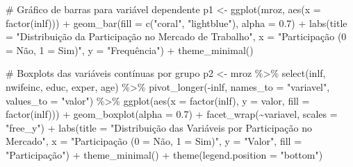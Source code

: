 \documentclass[
  letterpaper,
  DIV=11,
  numbers=noendperiod]{scrartcl}
\newenvironment{Shaded}{\begin{snugshade}}{\end{snugshade}}
\newcommand{\AttributeTok}[1]{\textcolor[rgb]{0.40,0.45,0.13}{#1}}
\newcommand{\CommentTok}[1]{\textcolor[rgb]{0.37,0.37,0.37}{#1}}
\newcommand{\FloatTok}[1]{\textcolor[rgb]{0.68,0.00,0.00}{#1}}
\newcommand{\FunctionTok}[1]{\textcolor[rgb]{0.28,0.35,0.67}{#1}}
\newcommand{\NormalTok}[1]{\textcolor[rgb]{0.00,0.23,0.31}{#1}}
\newcommand{\OtherTok}[1]{\textcolor[rgb]{0.00,0.23,0.31}{#1}}
\newcommand{\SpecialCharTok}[1]{\textcolor[rgb]{0.37,0.37,0.37}{#1}}
\newcommand{\StringTok}[1]{\textcolor[rgb]{0.13,0.47,0.30}{#1}}
\begin{document}
\begin{Shaded}
\begin{Highlighting}[]
\CommentTok{\# Gráfico de barras para variável dependente}
\NormalTok{p1 }\OtherTok{\textless{}{-}} \FunctionTok{ggplot}\NormalTok{(mroz, }\FunctionTok{aes}\NormalTok{(}\AttributeTok{x =} \FunctionTok{factor}\NormalTok{(inlf))) }\SpecialCharTok{+}
  \FunctionTok{geom\_bar}\NormalTok{(}\AttributeTok{fill =} \FunctionTok{c}\NormalTok{(}\StringTok{"coral"}\NormalTok{, }\StringTok{"lightblue"}\NormalTok{), }\AttributeTok{alpha =} \FloatTok{0.7}\NormalTok{) }\SpecialCharTok{+}
  \FunctionTok{labs}\NormalTok{(}\AttributeTok{title =} \StringTok{"Distribuição da Participação no Mercado de Trabalho"}\NormalTok{,}
       \AttributeTok{x =} \StringTok{"Participação (0 = Não, 1 = Sim)"}\NormalTok{,}
       \AttributeTok{y =} \StringTok{"Frequência"}\NormalTok{) }\SpecialCharTok{+}
  \FunctionTok{theme\_minimal}\NormalTok{()}

\CommentTok{\# Boxplots das variáveis contínuas por grupo}
\NormalTok{p2 }\OtherTok{\textless{}{-}}\NormalTok{ mroz }\SpecialCharTok{\%\textgreater{}\%}
  \FunctionTok{select}\NormalTok{(inlf, nwifeinc, educ, exper, age) }\SpecialCharTok{\%\textgreater{}\%}
  \FunctionTok{pivot\_longer}\NormalTok{(}\SpecialCharTok{{-}}\NormalTok{inlf, }\AttributeTok{names\_to =} \StringTok{"variavel"}\NormalTok{, }\AttributeTok{values\_to =} \StringTok{"valor"}\NormalTok{) }\SpecialCharTok{\%\textgreater{}\%}
  \FunctionTok{ggplot}\NormalTok{(}\FunctionTok{aes}\NormalTok{(}\AttributeTok{x =} \FunctionTok{factor}\NormalTok{(inlf), }\AttributeTok{y =}\NormalTok{ valor, }\AttributeTok{fill =} \FunctionTok{factor}\NormalTok{(inlf))) }\SpecialCharTok{+}
  \FunctionTok{geom\_boxplot}\NormalTok{(}\AttributeTok{alpha =} \FloatTok{0.7}\NormalTok{) }\SpecialCharTok{+}
  \FunctionTok{facet\_wrap}\NormalTok{(}\SpecialCharTok{\textasciitilde{}}\NormalTok{variavel, }\AttributeTok{scales =} \StringTok{"free\_y"}\NormalTok{) }\SpecialCharTok{+}
  \FunctionTok{labs}\NormalTok{(}\AttributeTok{title =} \StringTok{"Distribuição das Variáveis por Participação no Mercado"}\NormalTok{,}
       \AttributeTok{x =} \StringTok{"Participação (0 = Não, 1 = Sim)"}\NormalTok{,}
       \AttributeTok{y =} \StringTok{"Valor"}\NormalTok{,}
       \AttributeTok{fill =} \StringTok{"Participação"}\NormalTok{) }\SpecialCharTok{+}
  \FunctionTok{theme\_minimal}\NormalTok{() }\SpecialCharTok{+}
  \FunctionTok{theme}\NormalTok{(}\AttributeTok{legend.position =} \StringTok{"bottom"}\NormalTok{)}


\end{Highlighting}
\end{Shaded}
\end{document}

